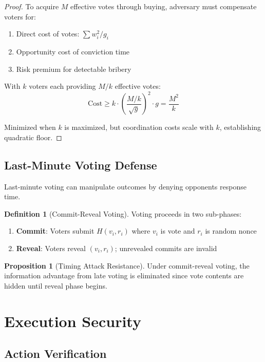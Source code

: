 \documentclass[11pt,a4paper]{article}
\theoremstyle{definition}
\newtheorem{definition}{Definition}[section]
\newtheorem{proposition}[theorem]{Proposition}
\theoremstyle{remark}
\begin{document}
\begin{proof}
To acquire $M$ effective votes through buying, adversary must compensate voters for:
\begin{enumerate}
    \item Direct cost of votes: $\sum w_i^2 / g_i$
    \item Opportunity cost of conviction time
    \item Risk premium for detectable bribery
\end{enumerate}

With $k$ voters each providing $M/k$ effective votes:
\begin{equation}
    \text{Cost} \geq k \cdot \left(\frac{M/k}{\sqrt{g}}\right)^2 \cdot g = \frac{M^2}{k}
\end{equation}

Minimized when $k$ is maximized, but coordination costs scale with $k$, establishing quadratic floor.
\end{proof}

\subsection{Last-Minute Voting Defense}

Last-minute voting can manipulate outcomes by denying opponents response time.

\begin{definition}[Commit-Reveal Voting]
Voting proceeds in two sub-phases:
\begin{enumerate}
    \item \textbf{Commit}: Voters submit $H(v_i, r_i)$ where $v_i$ is vote and $r_i$ is random nonce
    \item \textbf{Reveal}: Voters reveal $(v_i, r_i)$; unrevealed commits are invalid
\end{enumerate}
\end{definition}

\begin{proposition}[Timing Attack Resistance]
Under commit-reveal voting, the information advantage from late voting is eliminated since vote contents are hidden until reveal phase begins.
\end{proposition}

\section{Execution Security}

\subsection{Action Verification}
\end{document}
